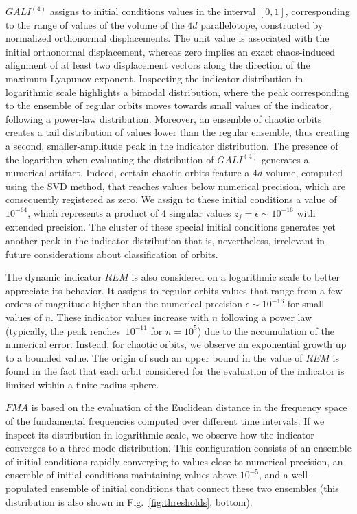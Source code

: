 $GALI^{(4)}$ assigns to initial conditions values in the interval $[0,1]$, corresponding to the range of values of the volume of the $4d$ parallelotope, constructed by normalized orthonormal displacements. The unit value is associated with the initial orthonormal displacement, whereas zero implies an exact chaos-induced alignment of at least two displacement vectors along the direction of the maximum Lyapunov exponent. Inspecting the indicator distribution in logarithmic scale highlights a bimodal distribution, where the peak corresponding to the ensemble of regular orbits moves towards small values of the indicator, following a power-law distribution. Moreover, an ensemble of chaotic orbits creates a tail distribution of values lower than the regular ensemble, thus creating a second, smaller-amplitude peak in the indicator distribution. The presence of the logarithm when evaluating the distribution of $GALI^{(4)}$ generates a numerical artifact. Indeed, certain chaotic orbits feature a $4d$ volume, computed using the SVD method, that reaches values below numerical precision, which are consequently registered as zero. We assign to these initial conditions a value of $10^{-64}$, which represents a product of 4 singular values $z_j=\epsilon\sim10^{-16}$ with extended precision. The cluster of these special initial conditions generates yet another peak in the indicator distribution that is, nevertheless, irrelevant in future considerations about classification of orbits. 

The dynamic indicator $REM$ is also considered on a logarithmic scale to better appreciate its behavior. It assigns to regular orbits values that range from a few orders of magnitude higher than the numerical precision $\epsilon\sim 10^{-16}$ for small values of $n$. These indicator values increase with $n$ following a power law (typically, the peak reaches $~10^{-11}$ for $n=10^5$) due to the accumulation of the numerical error. Instead, for chaotic orbits, we observe an exponential growth up to a bounded value. The origin of such an upper bound in the value of $REM$ is found in the fact that each orbit considered for the evaluation of the indicator is limited within a finite-radius sphere. 

$FMA$ is based on the evaluation of the Euclidean distance in the frequency space of the fundamental frequencies computed over different time intervals. If we inspect its distribution in logarithmic scale, we observe how the indicator converges to a three-mode distribution. This configuration consists of an ensemble of initial conditions rapidly converging to values close to numerical precision, an ensemble of initial conditions maintaining values above $10^{-5}$, and a well-populated ensemble of initial conditions that connect these two ensembles (this distribution is also shown in Fig.~\ref{fig:thresholds}, bottom). 

